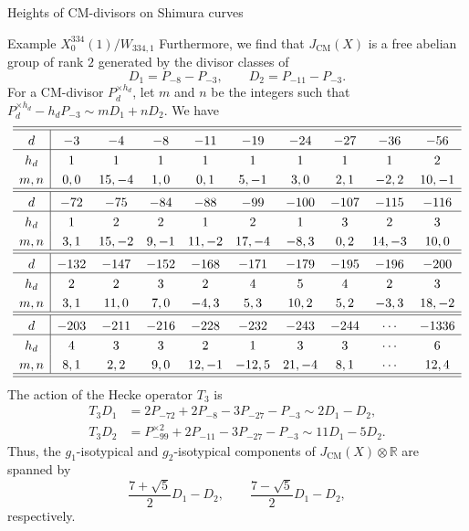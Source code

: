 \documentclass{amsart}
\theoremstyle{definition}
\def\R{\mathbb R}
\def\CM{\mathrm{CM}}
\begin{document}
\begin{section}{Heights of CM-divisors on Shimura curves}
\begin{subsection}{Example $X_0^{334}(1)/W_{334,1}$}
Furthermore, we find that $J_\CM(X)$ is a free abelian group of rank
$2$ generated by the divisor classes of
$$
  D_1=P_{-8}-P_{-3}, \qquad D_2=P_{-11}-P_{-3}.
$$
For a CM-divisor $P_d^{\times h_d}$, let $m$ and $n$ be the integers
such that $P_d^{\times h_d}-h_dP_{-3}\sim mD_1+nD_2$. We have
$$ \extrarowheight3pt
\begin{array}{c|ccccccccc} \hline\hline
 d & -3 & -4 & -8 & -11 & -19 & -24 & -27 & -36 & -56 \\ \hline
h_d& 1  &  1 &  1 &  1  &  1  &  1  &  1  &  1  &  2  \\
m,n& 0,0&15,-4&1,0& 0,1 &5,-1 & 3,0 & 2,1 &-2,2 &10,-1\\
\hline\hline
 d &-72 &-75 &-84 &-88 & -99 &-100 &-107 &-115 &-116 \\ \hline
h_d& 1  & 2 &  2 &  1 &  2  &  1  &  3  &  2  &  3   \\
m,n&3,1 &15,-2&9,-1&11,-2&17,-4&-8,3&0,2 &14,-3&10,0 \\ \hline\hline  
 d &-132&-147&-152&-168&-171&-179&-195&-196&-200 \\ \hline
h_d&  2 &  2 &  3 &  2 &  4 &  5 &  4 &  2 &  3  \\
m,n&3,1 &11,0&7,0 &-4,3&5,3 &10,2&5,2 &-3,3&18,-2\\ \hline\hline
 d &-203&-211&-216&-228&-232&-243&-244&\cdots&-1336 \\ \hline
h_d&  4 &  3 &  3 &  2 &  1 &  3 &  3 &\cdots&  6  \\
m,n&8,1 &2,2 &9,0 &12,-1&-12,5&21,-4&8,1&\cdots&12,4 \\ \hline\hline
\end{array}
$$
The action of the Hecke operator $T_3$ is
\begin{equation*}
\begin{split}
  T_3D_1&=2P_{-72}+2P_{-8}-3P_{-27}-P_{-3}\sim 2D_1-D_2, \\
  T_3D_2&=P_{-99}^{\times 2}+2P_{-11}-3P_{-27}-P_{-3}\sim
    11D_1-5D_2.
\end{split}
\end{equation*}
Thus, the $g_1$-isotypical and $g_2$-isotypical components of
$J_\CM(X)\otimes\R$ are spanned by
$$
  \frac{7+\sqrt 5}2D_1-D_2, \qquad \frac{7-\sqrt 5}2D_1-D_2,
$$
respectively.


\end{subsection}
\end{section}
\end{document}
